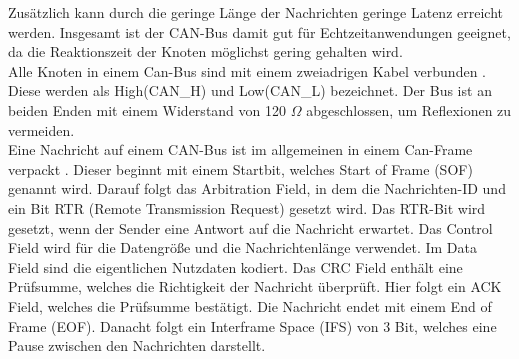 Zusätzlich kann durch die geringe Länge der Nachrichten geringe Latenz erreicht werden. 
Insgesamt ist der CAN-Bus damit gut für Echtzeitanwendungen geeignet, da die Reaktionszeit der Knoten möglichst gering gehalten wird.
\\
Alle Knoten in einem Can-Bus sind mit einem zweiadrigen Kabel verbunden \cite[Seite 132]{Voss2008}. 
Diese werden als High(CAN\_H) und Low(CAN\_L) 
bezeichnet. Der Bus ist an beiden Enden mit einem Widerstand von 120 $\Omega$ abgeschlossen, um Reflexionen zu vermeiden.
\\
Eine Nachricht auf einem CAN-Bus ist im allgemeinen in einem Can-Frame verpackt \cite[Seite 36]{Voss2008}. 
Dieser beginnt mit einem Startbit, welches Start of Frame (SOF) genannt wird. Darauf folgt das Arbitration Field, 
in dem die Nachrichten-ID und ein Bit RTR (Remote Transmission Request) gesetzt wird. Das RTR-Bit wird gesetzt,
wenn der Sender eine Antwort auf die Nachricht erwartet. Das Control Field wird für die Datengröße und die Nachrichtenlänge
verwendet. Im Data Field sind die eigentlichen Nutzdaten kodiert. Das CRC Field enthält eine Prüfsumme, welches die Richtigkeit
der Nachricht überprüft. Hier folgt ein ACK Field, welches die Prüfsumme bestätigt. Die Nachricht endet mit einem End of Frame (EOF).
Danacht folgt ein Interframe Space (IFS) von 3 Bit, welches eine Pause zwischen den Nachrichten darstellt.

